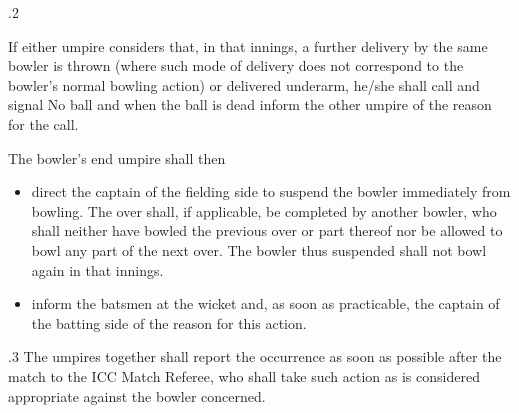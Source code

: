 \documentclass[12pt]{article}
\begin{document}
\vspace{\baselineskip}
\begin{adjustwidth}{0.5in}{0.08in}
{\fontsize{9pt}{10.8pt}.2 \tabto{0.49in} {\fontsize{8pt}{9.6pt}\selectfont If either umpire considers that, in that innings, a further delivery by the same bowler is thrown (where such mode of delivery does not correspond to the bowler’s normal bowling action) or delivered underarm, he/she shall call and signal No ball and when the ball is dead inform the other umpire of the reason for the call.\par}\par}\par

\end{adjustwidth}


\vspace{\baselineskip}
\begin{adjustwidth}{0.5in}{0.0in}
{\fontsize{9pt}{10.8pt}\selectfont The bowler’s end umpire shall then\par}\par

\end{adjustwidth}


\vspace{\baselineskip}
\begin{itemize}
	\item {\fontsize{9pt}{10.8pt}\selectfont direct the captain of the fielding side to suspend the bowler immediately from bowling. The over shall, if applicable, be completed by another bowler, who shall neither have bowled the previous over or part thereof nor be allowed to bowl any part of the next over. The bowler thus suspended shall not bowl again in that innings.\par}\par


\vspace{\baselineskip}
	\item {\fontsize{9pt}{10.8pt}\selectfont inform the batsmen at the wicket and, as soon as practicable, the captain of the batting side of the reason for this action.\par}
\end{itemize}\par


\vspace{\baselineskip}
\begin{adjustwidth}{0.5in}{0.32in}
{\fontsize{9pt}{10.8pt}.3 \tabto{0.49in} The umpires together shall report the occurrence as soon as possible after the match to the ICC Match Referee, who shall take such action as is considered appropriate against the bowler concerned.\par}\par

\end{adjustwidth}
\end{document}
